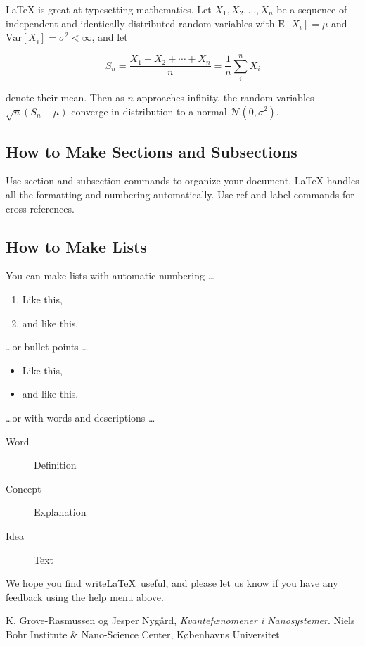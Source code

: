 \documentclass[a4paper]{article}
\begin{document}
\LaTeX{} is great at typesetting mathematics. Let $X_1, X_2, \ldots, X_n$ be a sequence of independent and identically distributed random variables with $\text{E}[X_i] = \mu$ and $\text{Var}[X_i] = \sigma^2 < \infty$, and let

\begin{equation}
S_n = \frac{X_1 + X_2 + \cdots + X_n}{n}
      = \frac{1}{n}\sum_{i}^{n} X_i
\label{eq:sn}
\end{equation}

denote their mean. Then as $n$ approaches infinity, the random variables $\sqrt{n}(S_n - \mu)$ converge in distribution to a normal $\mathcal{N}(0, \sigma^2)$.


\subsection{How to Make Sections and Subsections}

Use section and subsection commands to organize your document. \LaTeX{} handles all the formatting and numbering automatically. Use ref and label commands for cross-references.

\subsection{How to Make Lists}

You can make lists with automatic numbering \dots

\begin{enumerate}
\item Like this,
\item and like this.
\end{enumerate}
\dots or bullet points \dots
\begin{itemize}
\item Like this,
\item and like this.
\end{itemize}
\dots or with words and descriptions \dots
\begin{description}
\item[Word] Definition
\item[Concept] Explanation
\item[Idea] Text
\end{description}

We hope you find write\LaTeX\ useful, and please let us know if you have any feedback using the help menu above.

\begin{thebibliography}{9}
  K. Grove-Rasmussen og Jesper Nygård,
  \emph{Kvantefænomener i Nanosystemer}.
  Niels Bohr Institute \& Nano-Science Center, Københavns Universitet

\end{thebibliography}
\end{document}
